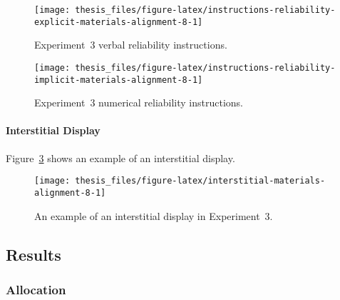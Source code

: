 \documentclass[a4paper, nobind]{templates/ociamthesis}
\theoremstyle{definition}
\theoremstyle{definition}
\theoremstyle{definition}
\theoremstyle{definition}
\theoremstyle{remark}
\begin{document}
\begin{figure}
\texttt{[image: thesis\_files/figure-latex/instructions-reliability-explicit-materials-alignment-8-1]} \caption{Experiment~3 verbal reliability instructions.}\label{fig:instructions-reliability-explicit-materials-alignment-8}
\end{figure}



\begin{figure}
\texttt{[image: thesis\_files/figure-latex/instructions-reliability-implicit-materials-alignment-8-1]} \caption{Experiment~3 numerical reliability instructions.}\label{fig:instructions-reliability-implicit-materials-alignment-8}
\end{figure}

\hypertarget{interstitial-materials-alignment-8}{%
\paragraph{Interstitial Display}\label{interstitial-materials-alignment-8}}

Figure~\ref{fig:interstitial-materials-alignment-8} shows an example of an
interstitial display.



\begin{figure}
\texttt{[image: thesis\_files/figure-latex/interstitial-materials-alignment-8-1]} \caption{An example of an interstitial display in Experiment~3.}\label{fig:interstitial-materials-alignment-8}
\end{figure}

\subsection{Results}

\hypertarget{results-alignment-8-allocation}{%
\subsubsection{Allocation}\label{results-alignment-8-allocation}}
\end{document}
